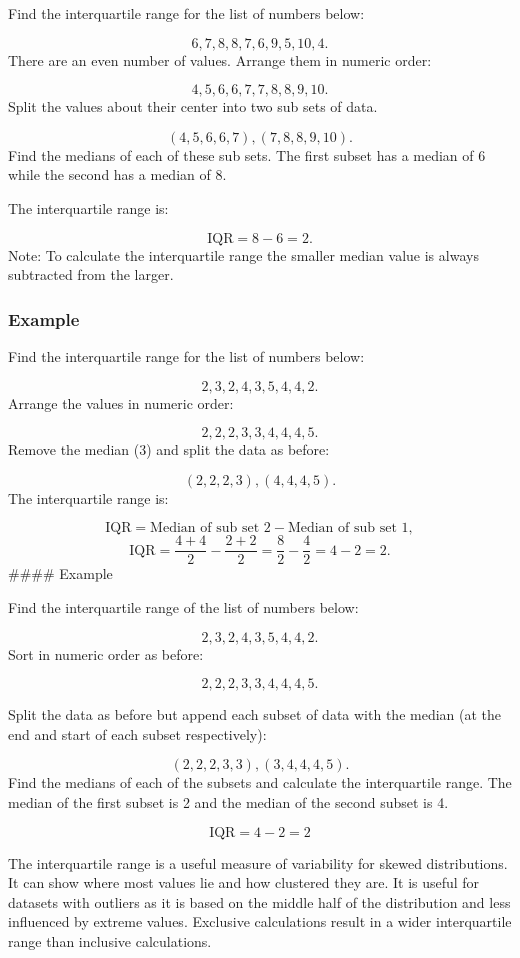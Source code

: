 \documentclass[
]{book}
\begin{document}
Find the interquartile range for the list of numbers below:

\[6, 7, 8, 8, 7, 6, 9, 5, 10, 4. \]
There are an even number of values. Arrange them in numeric order:

\[ 4, 5, 6, 6, 7, 7, 8, 8, 9, 10.\]
Split the values about their center into two sub sets of data.

\[ (4, 5, 6, 6, 7), (7, 8, 8, 9, 10). \]
Find the medians of each of these sub sets. The first subset has a median of 6 while the second has a median of 8.

The interquartile range is:

\[ \textrm{IQR} = 8 - 6 = 2.\]
Note: To calculate the interquartile range the smaller median value is always subtracted from the larger.

\hypertarget{example-9}{%
\subsubsection{Example}\label{example-9}}

Find the interquartile range for the list of numbers below:

\[2, 3, 2, 4, 3, 5, 4, 4, 2.\]
Arrange the values in numeric order:

\[2, 2, 2, 3, 3, 4, 4, 4, 5. \]
Remove the median (3) and split the data as before:

\[ (2, 2, 2, 3), (4, 4, 4, 5).\]
The interquartile range is:

\[ \textrm{IQR}=\textrm{Median of sub set 2}- \textrm{Median of sub set 1},\]
\[ \textrm{IQR}=\frac{4+4}{2} - \frac{2+2}{2}=\frac{8}{2} - \frac{4}{2} = 4 - 2= 2.\]
\#\#\#\# Example

Find the interquartile range of the list of numbers below:

\[ 2, 3, 2, 4, 3, 5, 4, 4, 2.\]
Sort in numeric order as before:

\[2, 2, 2, 3, 3, 4, 4, 4, 5.\]

Split the data as before but append each subset of data with the median (at the end and start of each subset respectively):

\[(2, 2, 2, 3, 3),(3, 4, 4, 4, 5).\]
Find the medians of each of the subsets and calculate the interquartile range. The median of the first subset is 2 and the median of the second subset is 4.

\[ \textrm{IQR} = 4 - 2 = 2 \]

The interquartile range is a useful measure of variability for skewed distributions. It can show where most values lie and how clustered they are. It is useful for datasets with outliers as it is based on the middle half of the distribution and less influenced by extreme values. Exclusive calculations result in a wider interquartile range than inclusive calculations.
\end{document}
